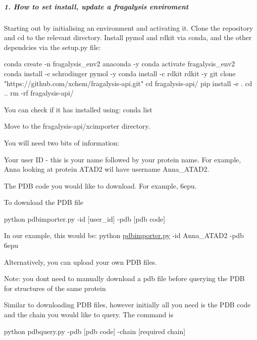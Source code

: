 \label{invalid_invalid}%
%
\subparagraph*{1. How to set install, update a fragalysis enviroment}

Starting out by initialising an environment and activating it. Clone the repository and cd to the relevant directory. Install pymol and rdkit via conda, and the other dependcies via the setup.\+py file\+:


\begin{DoxyCode}
conda create -n fragalysis\_env2 anaconda -y
conda activate fragalysis\_env2
conda install -c schrodinger pymol -y
conda install -c rdkit rdkit -y
git clone "https://github.com/xchem/fragalysis-api.git"
cd fragalysis-api/
pip install -e .
cd ..
rm -rf fragalysis-api/
\end{DoxyCode}


You can check if it has installed using\+: {\ttfamily conda list}

Move to the fragalysis-\/api/xcimporter directory.

You will need two bits of information\+:
\begin{DoxyEnumerate}
\item Your \textquotesingle{}user ID\textquotesingle{} -\/ this is your name followed by your protein name. For example, Anna looking at protein A\+T\+A\+D2 wil have username \textquotesingle{}Anna\+\_\+\+A\+T\+A\+D2\textquotesingle{}.
\item The P\+DB code you would like to download. For example, \textquotesingle{}6epu\textquotesingle{}.
\end{DoxyEnumerate}

To download the P\+DB file


\begin{DoxyCode}
python pdbimporter.py -id [user\_id] -pdb [pdb code]
\end{DoxyCode}


In our example, this would be\+: {\ttfamily python \hyperlink{pdbimporter_8py}{pdbimporter.\+py} -\/id Anna\+\_\+\+A\+T\+A\+D2 -\/pdb 6epu}

Alternatively, you can upload your own P\+DB files.

Note\+: you don\textquotesingle{}t need to manually download a pdb file before querying the P\+DB for structures of the same protein

Similar to downloading P\+DB files, however initially all you need is the P\+DB code and the chain you would like to query. The command is


\begin{DoxyCode}
python pdbquery.py -pdb [pdb code] -chain [required chain]
\end{DoxyCode}


